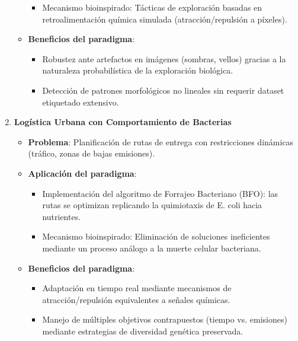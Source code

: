 \documentclass[14pt]{extarticle}
\begin{document}
\begin{enumerate}
\begin{itemize}
\begin{itemize}
            \item Mecanismo bioinspirado: Tácticas de exploración basadas en retroalimentación química simulada (atracción/repulsión a píxeles).
          \end{itemize}
          
        \item \textbf{Beneficios del paradigma}:
          \begin{itemize}
            \item Robustez ante artefactos en imágenes (sombras, vellos) gracias a la naturaleza probabilística de la exploración biológica.
            \item Detección de patrones morfológicos no lineales sin requerir dataset etiquetado extensivo.
          \end{itemize}
      \end{itemize}

    \item \textbf{Logística Urbana con Comportamiento de Bacterias}
    
      \begin{itemize}
        \item \textbf{Problema}: Planificación de rutas de entrega con restricciones dinámicas (tráfico, zonas de bajas emisiones).
        
        \item \textbf{Aplicación del paradigma}:

          \begin{itemize}
            \item Implementación del algoritmo de Forrajeo Bacteriano (BFO): las rutas se optimizan replicando la quimiotaxis de E. coli hacia nutrientes.
            
            \item Mecanismo bioinspirado: Eliminación de soluciones ineficientes mediante un proceso análogo a la muerte celular bacteriana.
          \end{itemize}
          
        \item \textbf{Beneficios del paradigma}:
        
          \begin{itemize}
            \item Adaptación en tiempo real mediante mecanismos de atracción/repulsión equivalentes a señales químicas.

            \item Manejo de múltiples objetivos contrapuestos (tiempo vs. emisiones) mediante estrategias de diversidad genética preservada.
          \end{itemize}
      \end{itemize}
  \end{enumerate}
\end{document}
